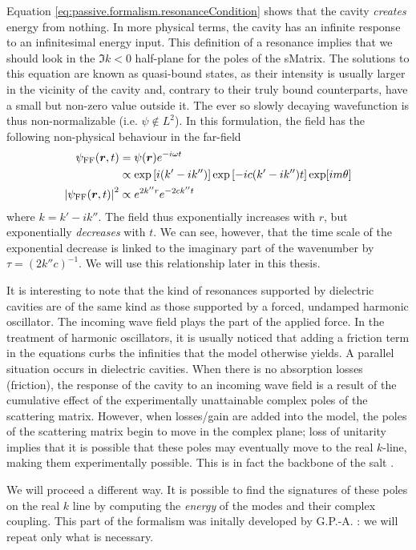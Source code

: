 Equation \eqref{eq:passive.formalism.resonanceCondition} shows that the cavity 
\textit{creates} energy from nothing. In more physical terms, the cavity
has an infinite response to an infinitesimal energy input. This definition
of a resonance implies that we should look in the $\Im{k}<0$ half-plane
for the poles of the \gls{sMatrix}. The solutions to this equation 
are known as quasi-bound states, as their intensity is usually larger
in the vicinity of the cavity and, contrary to their truly bound counterparts, 
have a small but non-zero value outside it. The ever so slowly decaying wavefunction
is thus non-normalizable (i.e. $\psi\notin L^2$). In this formulation, the field
has the following non-physical behaviour in the far-field
  \begin{align*}
   \psi_\text{FF}(\boldsymbol{r},t) 			&= \psi(\boldsymbol{r})e^{-i\omega t}	\\
						&\propto \exp\left[i(k'-ik'')\right]\exp\left[-ic(k'-ik'')t\right]\exp[im\theta]	\\
   \left|\psi_\text{FF}(\boldsymbol{r},t)\right|^2 	&\propto e^{2k''r}e^{-2ck''t} 
  \end{align*}
where $k=k'-ik''$. The field thus exponentially increases with $r$, 
but exponentially \textit{decreases} with $t$. We can see, however, 
that the time scale of the exponential decrease is linked to the
imaginary part of the wavenumber by $\tau=\left(2k''c\right)^{-1}$.
We will use this relationship later in this thesis.

It is interesting to note that the kind of resonances supported
by dielectric cavities are of the same kind as those supported
by a forced, undamped harmonic oscillator. The incoming wave field
plays the part of the applied force. In the treatment of 
harmonic oscillators, it is usually noticed that adding a friction 
term in the equations curbs the infinities that the model otherwise 
yields. A parallel situation occurs in dielectric cavities. When there
is no absorption losses (friction), the response of the cavity 
to an incoming wave field is a result of the cumulative effect 
of the experimentally unattainable complex poles of the scattering matrix. 
However, when losses/gain are added into the model, the poles of the scattering
matrix begin to move in the complex plane; loss of unitarity implies that
it is possible that these poles may eventually move to the real $k$-line, 
making them experimentally possible. This is in fact the backbone 
of the \gls{salt} \cite{GE2010a,GE2010b}.

We will proceed a different way. It is possible to find the signatures
of these poles on the real $k$ line by computing the \textit{energy}
of the modes and their complex coupling. This part of the formalism
was initally developed by G.P.-A. \cite{GAP2013}: we will repeat
only what is necessary. 

